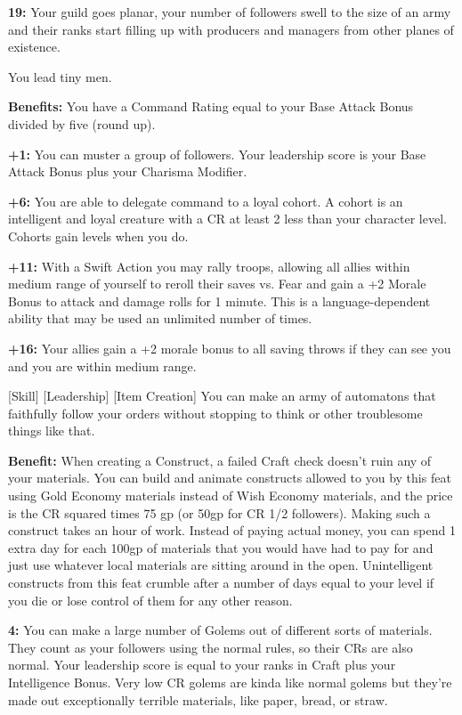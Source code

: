 \textbf{19:} Your guild goes planar, your number of followers swell to the size of an army and their ranks start filling up with producers and managers from other planes of existence.


You lead tiny men.

\textbf{Benefits:} You have a Command Rating equal to your Base Attack Bonus divided by five (round up).

\textbf{+1:} You can muster a group of followers. Your leadership score is your Base Attack Bonus plus your Charisma Modifier.

\textbf{+6:} You are able to delegate command to a loyal cohort. A cohort is an intelligent and loyal creature with a CR at least 2 less than your character level. Cohorts gain levels when you do.

\textbf{+11:} With a Swift Action you may rally troops, allowing all allies within medium range of yourself to reroll their saves vs. Fear and gain a +2 Morale Bonus to attack and damage rolls for 1 minute. This is a language-dependent ability that may be used an unlimited number of times.

\textbf{+16:} Your allies gain a +2 morale bonus to all saving throws if they can see you and you are within medium range.

 [Skill] [Leadership] [Item Creation]
You can make an army of automatons that faithfully follow your orders without stopping to think or other troublesome things like that.

\textbf{Benefit:} When creating a Construct, a failed Craft check doesn't ruin any of your materials. You can build and animate constructs allowed to you by this feat using Gold Economy materials instead of Wish Economy materials, and the price is the CR squared times 75 gp (or 50gp for CR 1/2 followers). Making such a construct takes an hour of work. Instead of paying actual money, you can spend 1 extra day for each 100gp of materials that you would have had to pay for and just use whatever local materials are sitting around in the open. Unintelligent constructs from this feat crumble after a number of days equal to your level if you die or lose control of them for any other reason.

\textbf{4:} You can make a large number of Golems out of different sorts of materials. They count as your followers using the normal rules, so their CRs are also normal. Your leadership score is equal to your ranks in Craft plus your Intelligence Bonus. Very low CR golems are kinda like normal golems but they're made out exceptionally terrible materials, like paper, bread, or straw.

